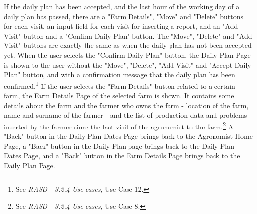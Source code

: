 \documentclass{article}
\begin{document}
If the daily plan has been accepted, and the last hour of the working day of a daily plan has passed, there are a "Farm Details", "Move" and "Delete" buttons for each visit, an input field for each visit for inserting a report, and an "Add Visit" button and a "Confirm Daily Plan" button. The "Move", "Delete" and "Add Visit" buttons are exactly the same as when the daily plan has not been accepted yet. When the user selects the "Confirm Daily Plan" button, the Daily Plan Page is shown to the user without the "Move", "Delete", "Add Visit" and "Accept Daily Plan" button, and with a confirmation message that the daily plan has been confirmed.\footnote{See \textit{RASD - 3.2.4 Use cases}, Use Case 12.} \newline
If the user selects the "Farm Details" button related to a certain farm, the Farm Details Page of the selected farm is shown. It contains some details about the farm and the farmer who owns the farm - location of the farm, name and surname of the farmer - and the list of production data and problems inserted by the farmer since the last visit of the agronomist to the farm.\footnote{See \textit{RASD - 3.2.4 Use cases}, Use Case 8.}\newline
A "Back" button in the Daily Plan Dates Page brings back to the Agronomist Home Page, a "Back" button in the Daily Plan page brings back to the Daily Plan Dates Page, and a "Back" button in the Farm Details Page brings back to the Daily Plan Page.
\vspace{5cm}
\end{document}
